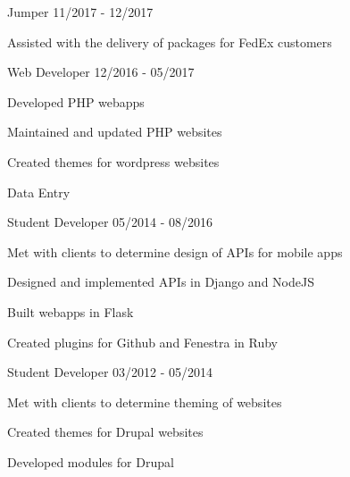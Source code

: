 \documentclass[11pt]{article} %
\begin{document}

\begin{description}

\squish
{}
           {Jumper}
           {11/2017 - 12/2017}

Assisted with the delivery of packages for FedEx customers


\squish
{}
           {Web Developer}
           {12/2016 - 05/2017}

Developed PHP webapps

Maintained and updated PHP websites

Created themes for wordpress websites

Data Entry


           {Student Developer}
           {05/2014 - 08/2016}

Met with clients to determine design of APIs for mobile apps

Designed and implemented APIs in Django and NodeJS

Built webapps in Flask

Created plugins for Github and Fenestra in Ruby


           {Student Developer}
           {03/2012 - 05/2014}

Met with clients to determine theming of websites

Created themes for Drupal websites

Developed modules for Drupal


\end{description}
\end{document}
